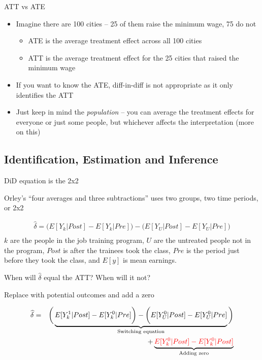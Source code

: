 \documentclass{beamer}
\begin{document}
\begin{frame}{ATT vs ATE}

\begin{itemize}
\item Imagine there are 100 cities -- 25 of them raise the minimum wage, 75 do not
	\begin{itemize}
	\item ATE is the average treatment effect across all 100 cities
	\item ATT is the average treatment effect for the 25 cities that raised the minimum wage
	\end{itemize}
\item If you want to know the ATE, diff-in-diff is not appropriate as it only identifies the ATT
\item Just keep in mind the \emph{population} -- you can average the treatment effects for everyone or just some people, but whichever affects the interpretation (more on this)
\end{itemize}

\end{frame}




\subsection{Identification, Estimation and Inference}


\begin{frame}{DiD equation is the 2x2}

Orley's ``four averages and three subtractions'' uses two groups, two time periods, or 2x2

\begin{eqnarray*}
\widehat{\delta} = \bigg ( E[Y_k|Post] - E[Y_k|Pre] \bigg ) - \bigg ( E[Y_U | Post ] - E[ Y_U | Pre] \bigg) \\
\end{eqnarray*}$k$ are the people in the job training program, $U$ are the untreated people not in the program, $Post$ is after the trainees took the class, $Pre$ is the period just before they took the class, and $E[y]$ is mean earnings. 

\bigskip

When will $\widehat{\delta}$ equal the ATT?  When will it not?

\end{frame}



\begin{frame}{Replace with potential outcomes and add a zero}

\begin{eqnarray*}
\widehat{\delta} &=& \bigg ( \underbrace{E[Y^1_k|Post] - E[Y^0_k|Pre] \bigg ) - \bigg ( E[Y^0_U | Post ] - E[ Y^0_U | Pre]}_{\mathclap{\text{Switching equation}}} \bigg)  \\
&&+ \underbrace{\textcolor{red}{E[Y_k^0 |Post] - E[Y^0_k | Post]}}_{\mathclap{\text{Adding zero}}} 
\end{eqnarray*}

\end{frame}
\end{document}

